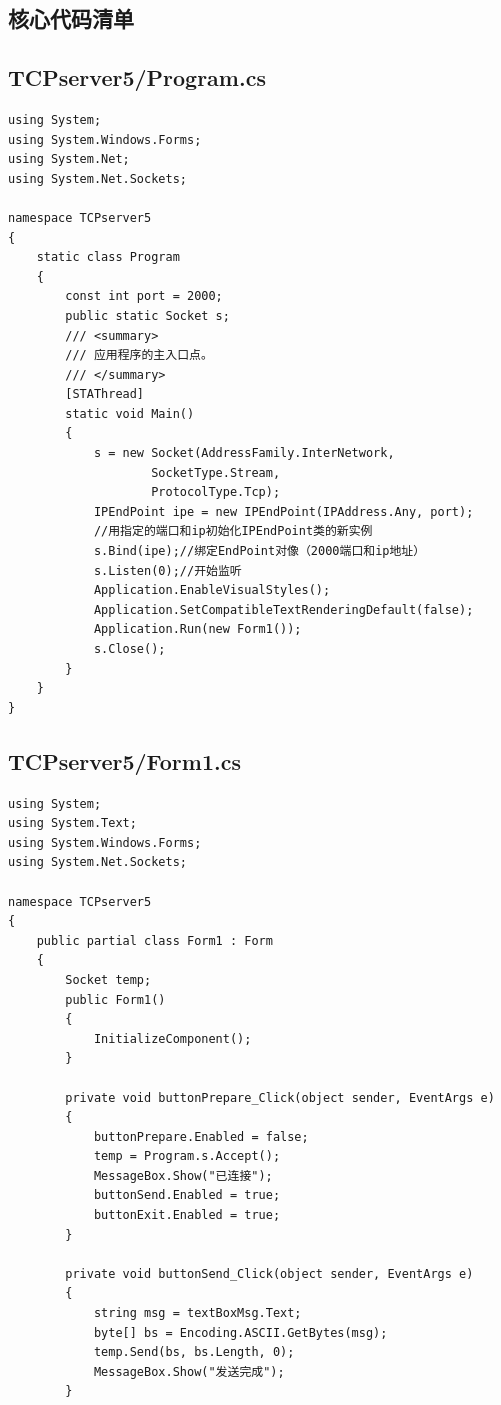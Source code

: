 \documentclass[a4paper]{ctexrep}
\begin{document}
\begin{appendix}
\chapter{核心代码清单}
\label{appendix}


\section{TCPserver5/Program.cs}
\label{TCPserver5/Program.cs}
\begin{lstlisting}
using System;
using System.Windows.Forms;
using System.Net;
using System.Net.Sockets;

namespace TCPserver5
{
	static class Program
	{
		const int port = 2000;
		public static Socket s;
		/// <summary>
		/// 应用程序的主入口点。
		/// </summary>
		[STAThread]
		static void Main()
		{
			s = new Socket(AddressFamily.InterNetwork,
			 		SocketType.Stream,
			 		ProtocolType.Tcp);
			IPEndPoint ipe = new IPEndPoint(IPAddress.Any, port);
			//用指定的端口和ip初始化IPEndPoint类的新实例
			s.Bind(ipe);//绑定EndPoint对像（2000端口和ip地址）  
			s.Listen(0);//开始监听
			Application.EnableVisualStyles();
			Application.SetCompatibleTextRenderingDefault(false);
			Application.Run(new Form1());
			s.Close();
		}
	}
}
\end{lstlisting}

\section{TCPserver5/Form1.cs}
\label{TCPserver5/Form1.cs}
\begin{lstlisting}
using System;
using System.Text;
using System.Windows.Forms;
using System.Net.Sockets;

namespace TCPserver5
{
	public partial class Form1 : Form
	{
		Socket temp;
		public Form1()
		{
			InitializeComponent();
		}

		private void buttonPrepare_Click(object sender, EventArgs e)
		{
			buttonPrepare.Enabled = false;
			temp = Program.s.Accept();
			MessageBox.Show("已连接");
			buttonSend.Enabled = true;
			buttonExit.Enabled = true;
		}

		private void buttonSend_Click(object sender, EventArgs e)
		{
			string msg = textBoxMsg.Text;
			byte[] bs = Encoding.ASCII.GetBytes(msg);
			temp.Send(bs, bs.Length, 0);
			MessageBox.Show("发送完成");
		}



\end{lstlisting}
\end{appendix}
\end{document}

